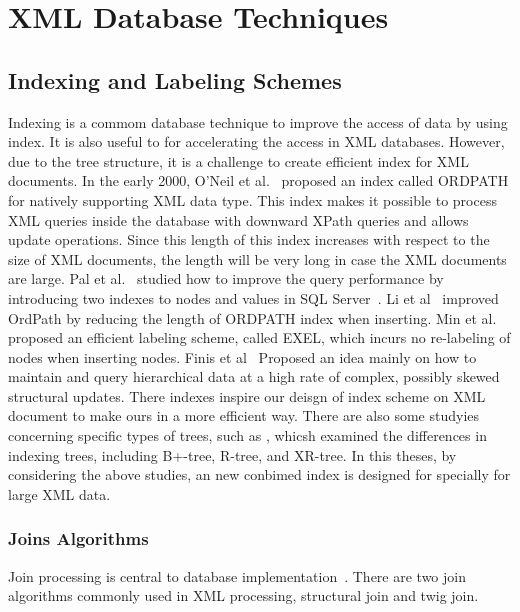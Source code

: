 \section{XML Database Techniques}

\subsection{Indexing and Labeling Schemes}

Indexing is a commom database technique to improve the access of data  by using
index. It is also useful to for accelerating the access in XML databases.
However, due to the tree structure, it is a challenge to create efficient  index
for XML documents. In the early 2000, O'Neil et al.~\cite{OOPC04} proposed an
index called ORDPATH for natively supporting XML data type. This index makes it
possible to process XML queries inside the database with downward XPath queries
and allows update operations. Since this length of this index increases with
respect to the size of XML documents, the length will be very long in case the
XML documents are large. Pal et al.~\cite{PCSS04} studied how to improve the
query performance by introducing two indexes to nodes and values in SQL
Server~\cite{sql2005}. Li et al~\cite{LiLi05} improved OrdPath by reducing the
length of ORDPATH index when inserting. Min et al.~\cite{MLCh07} proposed an
efficient labeling scheme, called EXEL, which incurs no re-labeling of nodes
when inserting nodes. Finis et al~\cite{FBKF15} Proposed an idea mainly on how
to maintain and query hierarchical data at a high rate of complex, possibly
skewed structural updates. There indexes inspire our deisgn of index scheme on
XML document to make ours in a more efficient way. There are also some studyies
concerning specific types of trees, such as \cite{ToGr02,JLWO03,CVZZ08}, whicsh
examined the differences in indexing trees, including B+-tree, R-tree, and
XR-tree. In this theses, by  considering the above studies, an new conbimed
index is designed for specially  for large XML data.

\subsubsection{Joins Algorithms}

Join processing is central to database implementation~\cite{graefe1993query}.
There are two join algorithms commonly used in XML processing, structural join
and twig join.

